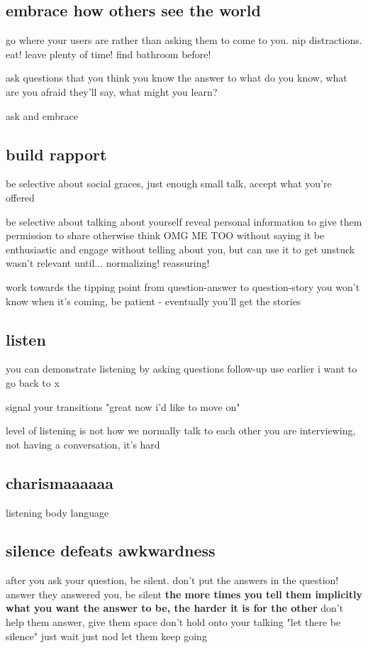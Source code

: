 \documentclass{article}
\begin{document}
\subsection{embrace how others see the world}
go where your users are rather than asking them to come to you. nip distractions. eat! leave plenty of time! find bathroom before!

ask questions that you think you know the answer to
what do you know, what are you afraid they'll say, what might you learn?

ask and embrace


\subsection{build rapport}
be selective about social graces, just enough small talk, accept what you're offered

be selective about talking about yourself
reveal personal information to give them permission to share
otherwise think OMG ME TOO without saying it
be enthusiastic and engage without telling about you, but can use it to get unstuck
wasn't relevant until... normalizing! reassuring!

work towards the tipping point
from question-answer to question-story
you won't know when it's coming, be patient - eventually you'll get the stories

\subsection{listen}
you can demonstrate listening by asking questions
follow-up
use earlier
i want to go back to x

signal your transitions
"great now i'd like to move on"

level of listening is not how we normally talk to each other
you are interviewing, not having a conversation, it's hard

\subsection{charismaaaaaa}
listening body language

\subsection{silence defeats awkwardness}
after you ask your question, be silent. don't put the answers in the question!
answer they answered you, be silent
{\bf the more times you tell them implicitly what you want the answer to be, the harder it is for the other}
don't help them answer, give them space
don't hold onto your talking
"let there be silence" just wait just nod let them keep going
\end{document}
